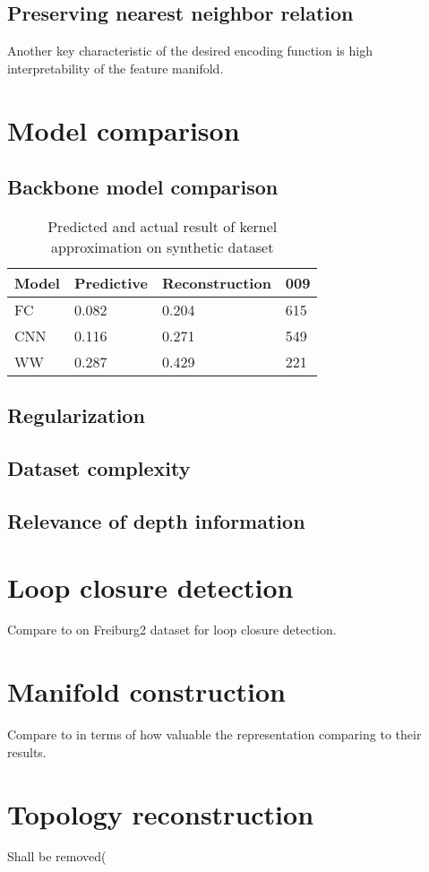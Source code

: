 \subsection{Preserving nearest neighbor relation}

Another key characteristic of the desired encoding function is high interpretability of the feature manifold.



\section{Model comparison}

\subsection{Backbone model comparison}

\begin{table}
\begin{center}
    \begin{tabular}{| l | l | l | l |}
    \hline
    Model  & Predictive & Reconstruction & 009 \\ \hline
    FC	   & 0.082 	    & 0.204	         & 615 \\ \hline
    CNN 	 & 0.116 	    & 0.271 	       & 549 \\ \hline
    WW 	   & 0.287 	    & 0.429 	       & 221 \\ \hline
    \end{tabular}
\end{center}
  \caption{Predicted and actual result of kernel approximation on synthetic dataset}
  \label{tab:kernel}
\end{table}


\subsection{Regularization}


\subsection{Dataset complexity}


\subsection{Relevance of depth information}




\section{Loop closure detection}

Compare to \cite{Xia2016} on Freiburg2 dataset for loop closure detection.

\section{Manifold construction}

Compare to \cite{Jaderberg2015} in terms of how valuable the representation comparing to their results.

\section{Topology reconstruction}

Shall be removed(
